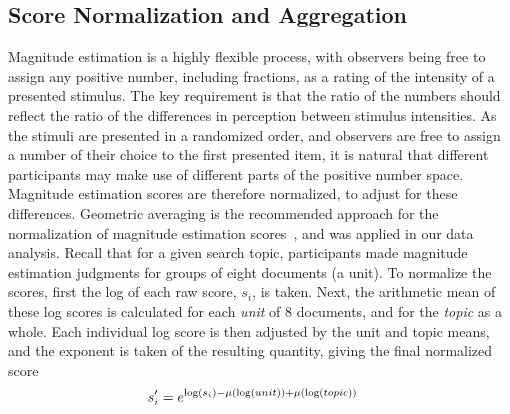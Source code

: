 
\subsection{Score Normalization and Aggregation} 
\label{sec:score-normalization}

Magnitude estimation is a highly flexible process, with observers being
free to assign any positive number, including fractions, as a rating of
the intensity of a presented stimulus.
The key requirement is that the ratio of the numbers should reflect the
ratio of the differences in perception between stimulus intensities.
As the stimuli are presented in a randomized order, and observers are
free to assign a number of their choice to the first presented item, it
is natural that different participants may make use of different parts
of the positive number space.
Magnitude estimation scores are therefore normalized, to adjust for
these differences.
Geometric averaging is the recommended approach for the normalization
of magnitude estimation scores~\cite{Ges97,McG03,moskowitz:1977}, and
was applied in our data analysis.
Recall that for a given search topic, participants made magnitude
estimation judgments for groups of eight documents (a unit).
To normalize the scores, first the log of each raw score, $s_i$, is
taken. Next, the arithmetic mean of these log scores is calculated for
each {\emph{unit}} of 8 documents, and for the {\emph{topic}} as a
whole. 
Each individual log score is then adjusted by the unit and topic means,
and the exponent is taken of the resulting quantity, giving the final
normalized score 
\begin{align}
  s'_i &= e^{\log(s_i) - \mu(\log(\mathnormal{unit})) + \mu
           (\log(\mathnormal{topic})) } \label{eq:1}
\end{align}
